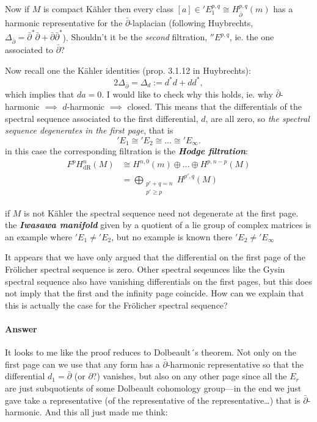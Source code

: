 Now if $M$ is compact K\"ahler then every class $[a]\in 'E^{p,q}_1\cong H^{p,q}_{\bar\partial}(m)$ has a harmonic representative for the $\bar\partial$-laplacian (following Huybrechts, $\Delta_{\bar\partial}=\bar\partial^*\bar\partial+\bar\partial\bar\partial^*$). {\color{blue}Shouldn't it be the \textit{second} filtration, $''E^{p,q}$, ie. the one associated to $\bar\partial$?}

Now recall one the K\"ahler identities (prop. 3.1.12 in Huybrechts):
\[2\Delta_{\bar\partial}=\Delta_d:=d^*d+dd^*,\]
which {\color{blue}implies} that $da=0$. {\color{blue}I would like to check why this holds, ie. why $\bar\partial$-harmonic $\implies$ $d$-harmonic $\implies$ closed}. This means that the differentials of the spectral sequence associated to the first differential, $d$, are all zero, so \textit{the spectral sequence degenerates in the first page}, that is
\['E_1\cong 'E_2\cong \ldots\cong 'E_\infty.\]
in this case the corresponding filtration is the \textit{\textbf{Hodge filtration}}:
\begin{align*}
	F^pH^{n}_{\operatorname{dR}}(M)&\cong H^{n,0}(m)\oplus\ldots\oplus H^{p,n-p}(M)\\
				       &=\bigoplus_{\substack{p'+q=n \\ p'\geq p}}  H^{p',q}(M)
\end{align*}
\begin{remark}
	if $M$ is not K\"ahler the spectral sequence need not degenerate at the first page. the \textit{\textbf{Iwasawa manifold}} given by a quotient of a lie group of complex matrices is an example where $'E_1\neq 'E_2$, but no example is known there ${'E_2\neq 'E_\infty}$
\end{remark}

\begin{question}[Altan]
	It appears that we have only argued that the differential on the first page of the Fr\"olicher spectral sequence is zero. Other spectral seqeunces like the Gysin spectral sequence also have vanishing differentials on the first pages, but this does not imply that the first and the infinity page coincide. How can we explain that this is actually the case for the Fr\"olicher spectral sequence?
\end{question}

\paragraph{Answer}It looks to me like the proof reduces to Dolbeault´s theorem. Not only on the first page can we use that any form has a $\bar\partial$-harmonic representative so that the differential $d_1=\bar\partial$ (or $\partial$?) vanishes, but also on any other page since all the $E_{r}$ are just subquotients of some Dolbeault cohomology group---in the end we just gave take a representative (of the representative of the representative…) that is $\bar\partial$-harmonic. And this all just made me think:

